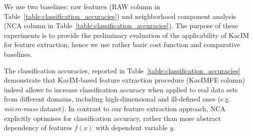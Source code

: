 \documentclass{article}
\begin{document}
We use two baselines: raw features (RAW column in Table~\ref{table:classification_accuracies}) and neighborhood component analysis~\cite{NIPS2004_42fe8808} (NCA column in Table~\ref{table:classification_accuracies}).  The purpose of these experiments is to provide the preliminary evaluation of the applicability of KacIM for feature extraction, hence we use rather basic cost function and comparative baselines.




The classification accuracies, reported in Table~\ref{table:classification_accuracies} demonstrate that KacIM-based feature extraction procedure (KacIMFE column) indeed allows to increase classification accuracy when applied to real data sets from different domains, including high-dimensional and ill-defined ones (e.g. \textit{micro-mass} dataset). In contrast to our feature extraction approach, NCA explicitly optimises for classification accuracy, rather than more abstract dependency of features $f(x)$ with dependent variable $y$.
\end{document}
